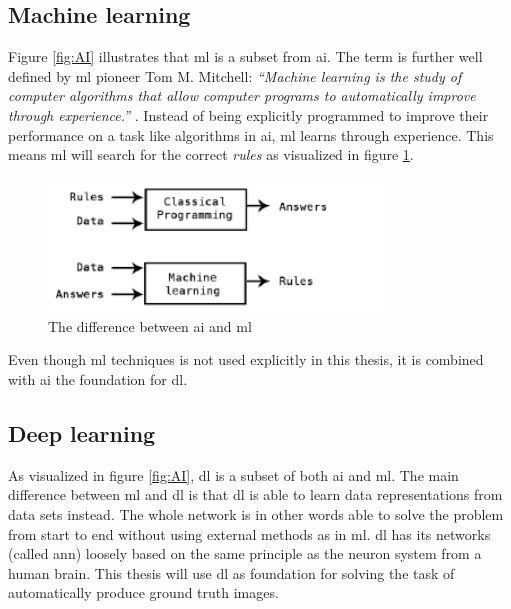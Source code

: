 \documentclass[USenglish]{ifimaster}  %
\begin{document}
\subsection{Machine learning}
Figure \cref{fig:AI} illustrates that \ac{ml} is a subset from \ac{ai}. The term is further well defined by \ac{ml} pioneer Tom M. Mitchell:
\newline
\newline
\textit{“Machine learning is the study of computer algorithms that allow computer programs to automatically improve through experience.”} \cite{tom_mitchell}.
\newline
\newline
Instead of being explicitly programmed to improve their performance on a task like algorithms in \ac{ai}, \ac{ml} learns through experience. This means \ac{ml} will search for the correct \textit{rules} as visualized in figure \cref{fig:ml}\cite{Francois_Deep_learning_with_python}.

\begin{figure}[ht]
    \centering
    \includegraphics[width=0.8\textwidth]{bilder/ml.png}
    \caption{The difference between \ac{ai} and \ac{ml} \cite{Francois_Deep_learning_with_python}}
    \label{fig:ml}
\end{figure}

Even though \ac{ml} techniques is not used explicitly in this thesis, it is combined with \ac{ai} the foundation for \ac{dl}.

\subsection{Deep learning}
As visualized in figure \cref{fig:AI}, \ac{dl} is a subset of both \ac{ai} and \ac{ml}. The main difference between \ac{ml} and \ac{dl} is that \ac{dl} is able to learn data representations from data sets instead. The whole network is in other words able to solve the problem from start to end without using external methods as in \ac{ml}. \ac{dl} has its networks (called \ac{ann}) loosely based on the same principle as the neuron system from a human brain. This thesis will use \ac{dl} as foundation for solving the task of automatically produce ground truth images. 
\end{document}
